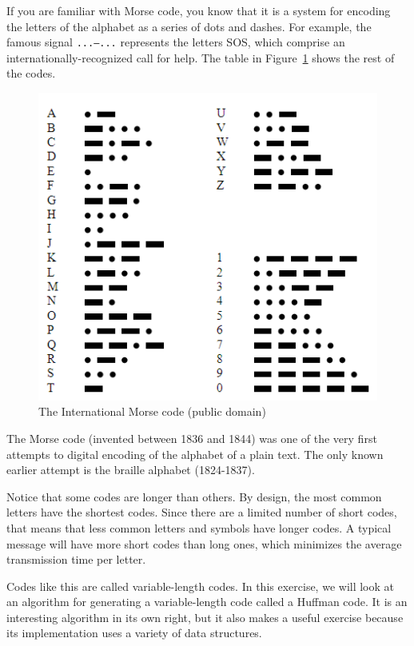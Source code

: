 If you are familiar with Morse code, you know that it is a 
system for encoding the letters of the alphabet as a series 
of dots and dashes. For example, the famous signal {\tt ...---...} 
represents the letters SOS, which comprise an 
internationally-recognized call for help. The table 
in Figure~\ref{fig.morse} shows the rest of the codes.

\begin{figure}
\centerline
{\includegraphics[scale=0.6]{figs/International_Morse_Code.PNG}}
\caption{The International Morse code (public domain)}
\label{fig.morse}
\end{figure}

The Morse code (invented between 1836 and 1844) was one of the 
very first attempts to digital encoding of the alphabet of a 
plain text. The only known earlier attempt is the braille 
alphabet (1824-1837).

Notice that some codes are longer than others. By design, the 
most common letters have the shortest codes. Since there are a 
limited number of short codes, that means that less common letters 
and symbols have longer codes. A typical message will have more 
short codes than long ones, which minimizes the average 
transmission time per letter.

Codes like this are called variable-length codes. In this exercise, 
we will look at an algorithm for generating a variable-length code 
called a Huffman code. It is an interesting algorithm in its own 
right, but it also makes a useful exercise because its implementation 
uses a variety of data structures.


